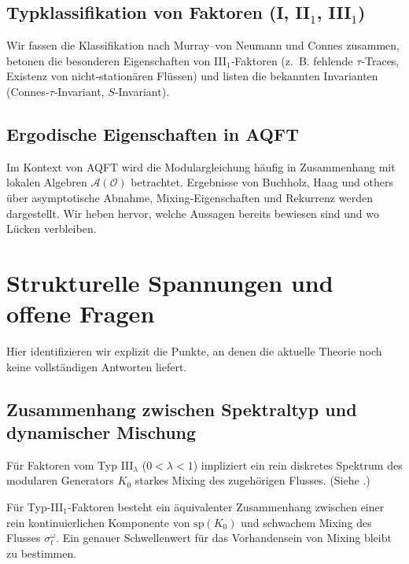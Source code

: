 \documentclass[12pt, a4paper]{article}
\begin{document}
\subsection{Typklassifikation von Faktoren (I, II$_1$, III$_1$)}
Wir fassen die Klassifikation nach Murray–von Neumann und Connes zusammen, betonen die besonderen Eigenschaften von III$_1$‑Faktoren (z.~B. fehlende $\tau$‑Traces, Existenz von nicht‑stationären Flüssen) und listen die bekannten Invarianten (Connes‑$\tau$‑Invariant, $S$‑Invariant).

\subsection{Ergodische Eigenschaften in AQFT}
Im Kontext von AQFT wird die Modulargleichung häufig in Zusammenhang mit lokalen Algebren $\mathcal{A}(\mathcal{O})$ betrachtet. Ergebnisse von Buchholz, Haag und others über asymptotische Abnahme, Mixing‑Eigenschaften und Rekurrenz werden dargestellt. Wir heben hervor, welche Aussagen bereits bewiesen sind und wo Lücken verbleiben.

\section{Strukturelle Spannungen und offene Fragen}
Hier identifizieren wir explizit die Punkte, an denen die aktuelle Theorie noch keine vollständigen Antworten liefert.

\subsection{Zusammenhang zwischen Spektraltyp und dynamischer Mischung}
\begin{proposition}[Bekannt]
Für Faktoren vom Typ III$_\lambda$ ($0<\lambda<1$) impliziert ein rein diskretes Spektrum des modularen Generators $K_0$ starkes Mixing des zugehörigen Flusses. (Siehe \cite{Connes1974}.)
\end{proposition}
\begin{conjecture}[Offen]
Für Typ‑III$_1$‑Faktoren besteht ein äquivalenter Zusammenhang zwischen einer rein kontinuierlichen Komponente von $\mathrm{sp}(K_0)$ und schwachem Mixing des Flusses $\sigma_t^{\omega}$. Ein genauer Schwellenwert für das Vorhandensein von Mixing bleibt zu bestimmen.
\end{conjecture}
\end{document}
